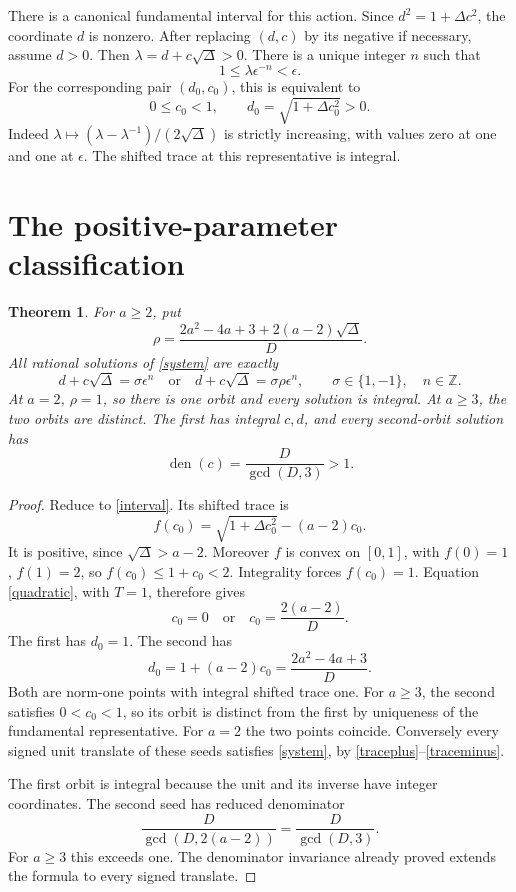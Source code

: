 \documentclass[11pt]{article}
\newtheorem{theorem}{Theorem}
\newcommand{\Z}{\mathbb Z}\newcommand{\Q}{\mathbb Q}
\begin{document}
There is a canonical fundamental interval for this action. Since
\(d^2=1+\Delta c^2\), the coordinate \(d\) is nonzero.
After replacing \((d,c)\) by its negative if necessary, assume
\(d>0\). Then \(\lambda=d+c\sqrt\Delta>0\). There is a
unique integer \(n\) such that
\[
                  1\le\lambda\epsilon^{-n}<\epsilon.
\]
For the corresponding pair \((d_0,c_0)\), this is equivalent to
\begin{equation}\label{interval}
       0\le c_0<1,\qquad d_0=\sqrt{1+\Delta c_0^2}>0.
\end{equation}
Indeed \(\lambda\mapsto(\lambda-\lambda^{-1})/(2\sqrt\Delta)\)
is strictly increasing, with values zero at one and one at
\(\epsilon\). The shifted trace at this representative is integral.

\section{The positive-parameter classification}

\begin{theorem}\label{positive}
For \(a\ge2\), put
\[
 \rho=\frac{2a^2-4a+3+2(a-2)\sqrt\Delta}{D}.
\]
All rational solutions of \eqref{system} are exactly
\begin{equation}\label{two}
 d+c\sqrt\Delta=\sigma\epsilon^n
 \quad\text{or}\quad
 d+c\sqrt\Delta=\sigma\rho\epsilon^n,
 \qquad \sigma\in\{1,-1\},\quad n\in\Z.
\end{equation}
At \(a=2\), \(\rho=1\), so there is one orbit and every solution
is integral. At \(a\ge3\), the two orbits are distinct. The first
has integral \(c,d\), and every second-orbit solution has
\begin{equation}\label{denominator}
                 \operatorname{den}(c)=\frac{D}{\gcd(D,3)}>1.
\end{equation}
\end{theorem}
\begin{proof}
Reduce to \eqref{interval}. Its shifted trace is
\[
 f(c_0)=\sqrt{1+\Delta c_0^2}-(a-2)c_0.
\]
It is positive, since \(\sqrt\Delta>a-2\). Moreover \(f\) is
convex on \([0,1]\), with \(f(0)=1\), \(f(1)=2\), so
\(f(c_0)\le1+c_0<2\). Integrality forces \(f(c_0)=1\).
Equation \eqref{quadratic}, with \(T=1\), therefore gives
\[
                 c_0=0\quad\text{or}\quad c_0=\frac{2(a-2)}D.
\]
The first has \(d_0=1\). The second has
\[
 d_0=1+(a-2)c_0=\frac{2a^2-4a+3}D.
\]
Both are norm-one points with integral shifted trace one. For
\(a\ge3\), the second satisfies \(0<c_0<1\), so its orbit is
distinct from the first by uniqueness of the fundamental representative.
For \(a=2\) the two points coincide. Conversely every signed unit
translate of these seeds satisfies \eqref{system}, by
\eqref{traceplus}--\eqref{traceminus}.

The first orbit is integral because the unit and its inverse have
integer coordinates. The second seed has reduced denominator
\[
 \frac{D}{\gcd(D,2(a-2))}=\frac{D}{\gcd(D,3)}.
\]
For \(a\ge3\) this exceeds one. The denominator invariance already
proved extends the formula to every signed translate.
\end{proof}
\end{document}
